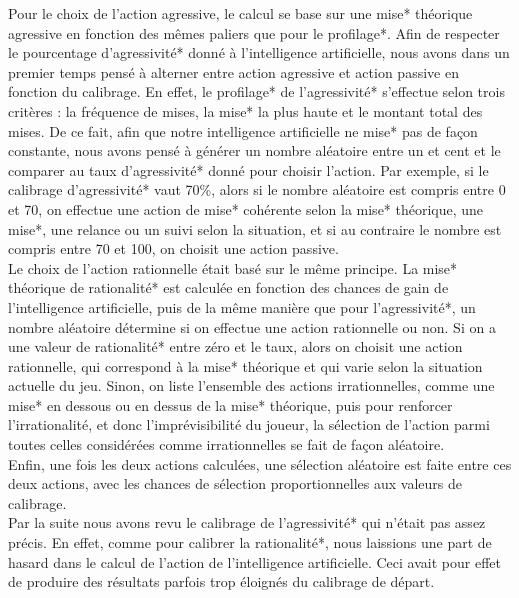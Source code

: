 \documentclass{report}
\begin{document}
Pour le choix de l'action agressive, le calcul se base sur une mise* théorique agressive en fonction des mêmes paliers que pour le profilage*. Afin de respecter le pourcentage d'agressivité* donné à l'intelligence artificielle, nous avons dans un premier temps pensé à alterner entre action agressive et action passive en fonction du calibrage. En effet, le profilage* de l'agressivité* s'effectue selon trois critères : la fréquence de mises, la mise* la plus haute et le montant total des mises. De ce fait, afin que notre intelligence artificielle ne mise* pas de façon constante, nous avons pensé à générer un nombre aléatoire entre un et cent et le comparer au taux d'agressivité* donné pour choisir l'action. Par exemple, si le calibrage d'agressivité* vaut 70\%, alors si le nombre aléatoire est compris entre 0 et 70, on effectue une action de mise* cohérente selon la mise* théorique, une mise*, une relance ou un suivi selon la situation, et si au contraire le nombre est compris entre 70 et 100, on choisit une action passive.\\

Le choix de l'action rationnelle était basé sur le même principe. La mise* théorique de rationalité* est calculée en fonction des chances de gain de l'intelligence artificielle, puis de la même manière que pour l'agressivité*, un nombre aléatoire détermine si on effectue une action rationnelle ou non. Si on a une valeur de rationalité* entre zéro et le taux, alors on choisit une action rationnelle, qui correspond à la mise* théorique et qui varie selon la situation actuelle du jeu. Sinon, on liste l'ensemble des actions irrationnelles, comme une mise* en dessous ou en dessus de la mise* théorique, puis pour renforcer l’irrationalité, et donc l'imprévisibilité du joueur, la sélection de l'action parmi toutes celles considérées comme irrationnelles se fait de façon aléatoire.\\

Enfin, une fois les deux actions calculées, une sélection aléatoire est faite entre ces deux actions, avec les chances de sélection proportionnelles aux valeurs de calibrage.\\

Par la suite nous avons revu le calibrage de l'agressivité* qui n'était pas assez précis. En effet, comme pour calibrer la rationalité*, nous laissions une part de hasard dans le calcul de l'action de l'intelligence artificielle. Ceci avait pour effet de produire des résultats parfois trop éloignés du calibrage de départ.\\
\end{document}
